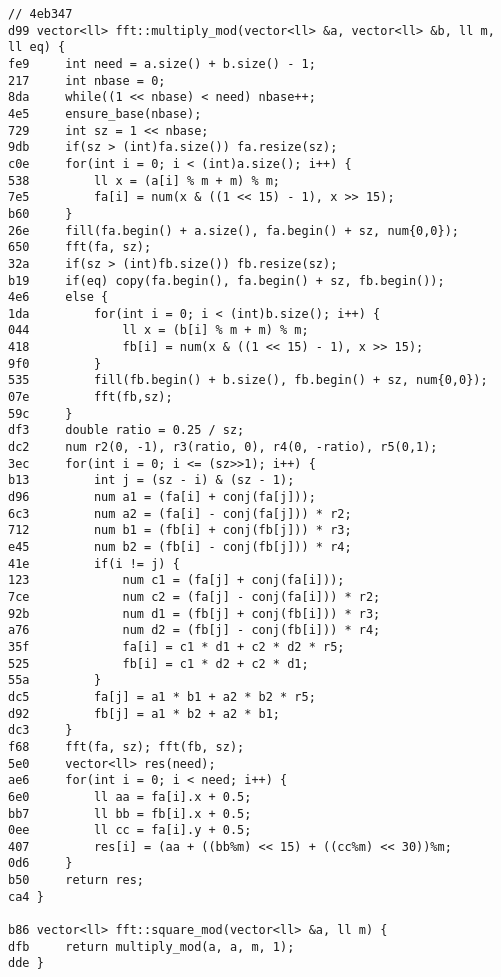 \documentclass[11pt, a4paper, twoside]{article}
\begin{document}
\begin{lstlisting}
// 4eb347
d99 vector<ll> fft::multiply_mod(vector<ll> &a, vector<ll> &b, ll m, ll eq) {
fe9     int need = a.size() + b.size() - 1;
217     int nbase = 0;
8da     while((1 << nbase) < need) nbase++;
4e5     ensure_base(nbase);
729     int sz = 1 << nbase;
9db     if(sz > (int)fa.size()) fa.resize(sz);
c0e     for(int i = 0; i < (int)a.size(); i++) {
538         ll x = (a[i] % m + m) % m;
7e5         fa[i] = num(x & ((1 << 15) - 1), x >> 15);
b60     }
26e     fill(fa.begin() + a.size(), fa.begin() + sz, num{0,0});
650     fft(fa, sz);
32a     if(sz > (int)fb.size()) fb.resize(sz);
b19     if(eq) copy(fa.begin(), fa.begin() + sz, fb.begin());
4e6     else {
1da         for(int i = 0; i < (int)b.size(); i++) {
044             ll x = (b[i] % m + m) % m;
418             fb[i] = num(x & ((1 << 15) - 1), x >> 15);
9f0         }
535         fill(fb.begin() + b.size(), fb.begin() + sz, num{0,0});
07e         fft(fb,sz);
59c     }
df3     double ratio = 0.25 / sz;
dc2     num r2(0, -1), r3(ratio, 0), r4(0, -ratio), r5(0,1);
3ec     for(int i = 0; i <= (sz>>1); i++) {
b13         int j = (sz - i) & (sz - 1);
d96         num a1 = (fa[i] + conj(fa[j]));
6c3         num a2 = (fa[i] - conj(fa[j])) * r2;
712         num b1 = (fb[i] + conj(fb[j])) * r3;
e45         num b2 = (fb[i] - conj(fb[j])) * r4;
41e         if(i != j) {
123             num c1 = (fa[j] + conj(fa[i]));
7ce             num c2 = (fa[j] - conj(fa[i])) * r2;
92b             num d1 = (fb[j] + conj(fb[i])) * r3;
a76             num d2 = (fb[j] - conj(fb[i])) * r4;
35f             fa[i] = c1 * d1 + c2 * d2 * r5;
525             fb[i] = c1 * d2 + c2 * d1;
55a         }
dc5         fa[j] = a1 * b1 + a2 * b2 * r5;
d92         fb[j] = a1 * b2 + a2 * b1;
dc3     }
f68     fft(fa, sz); fft(fb, sz);
5e0     vector<ll> res(need);
ae6     for(int i = 0; i < need; i++) {
6e0         ll aa = fa[i].x + 0.5;
bb7         ll bb = fb[i].x + 0.5;
0ee         ll cc = fa[i].y + 0.5;
407         res[i] = (aa + ((bb%m) << 15) + ((cc%m) << 30))%m;
0d6     }
b50     return res;
ca4 }

b86 vector<ll> fft::square_mod(vector<ll> &a, ll m) {
dfb     return multiply_mod(a, a, m, 1);
dde }
\end{lstlisting}
\end{document}
